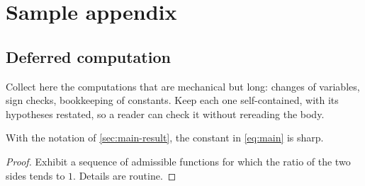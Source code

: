 
\section{Sample appendix}
\label{app:sample-appendix}

\subsection{Deferred computation}

Collect here the computations that are mechanical but long: changes of
variables, sign checks, bookkeeping of constants. Keep each one
self-contained, with its hypotheses restated, so a reader can check it
without rereading the body.

\begin{lemma}
\label{lem:appendix}
With the notation of \cref{sec:main-result}, the constant in
\cref{eq:main} is sharp.
\end{lemma}

\begin{proof}
Exhibit a sequence of admissible functions for which the ratio of the
two sides tends to $1$. Details are routine.
\end{proof}
